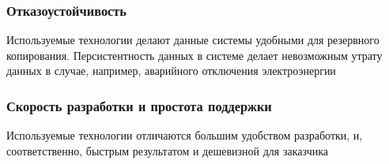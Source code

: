 \documentclass{beamer}
\begin{document}
\begin{frame}
\frametitle{Отказоустойчивость}
	Используемые технологии делают данные системы удобными для резервного
	копирования. Персистентность данных в системе делает невозможным утрату данных в
	случае, например, аварийного отключения электроэнергии
\end{frame}

\begin{frame}
\frametitle{Скорость разработки и простота поддержки}
	Используемые технологии отличаются большим удобством разработки, и,
	соответственно, быстрым результатом и дешевизной для заказчика
\end{frame}
\end{document}

